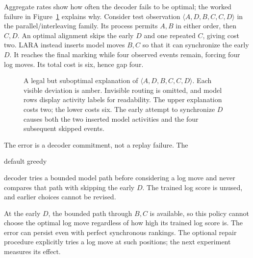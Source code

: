 Aggregate rates show how often the decoder fails to be optimal; the worked failure in Figure~\ref{fig:failure} explains why. Consider test observation $\langle A,D,B,C,C,D\rangle$ in the parallel/interleaving family. Its process permits $A,B$ in either order, then $C,D$. An optimal alignment skips the early $D$ and one repeated $C$, giving cost two. LARA instead inserts model moves $B,C$ so that it can synchronize the early $D$. It reaches the final marking while four observed events remain, forcing four log moves. Its total cost is six, hence gap four.

\begin{figure}[!t]
\centering

\caption{A legal but suboptimal explanation of $\langle A,D,B,C,C,D\rangle$. Each visible deviation is amber. Invisible routing is omitted, and model rows display activity labels for readability. The upper explanation costs two; the lower costs six. The early attempt to synchronize $D$ causes both the two inserted model activities and the four subsequent skipped events.}
\label{fig:failure}
\end{figure}

The error is a decoder commitment, not a replay failure. The \begin{revised}default greedy\end{revised} decoder tries a bounded model path before considering a log move and never compares that path with skipping the early $D$. The trained log score is unused, and earlier choices cannot be revised. \begin{revised}At the early $D$, the bounded path through $B,C$ is available, so this policy cannot choose the optimal log move regardless of how high its trained log score is. The error can persist even with perfect synchronous rankings. The optional repair procedure explicitly tries a log move at such positions; the next experiment measures its effect.\end{revised}


